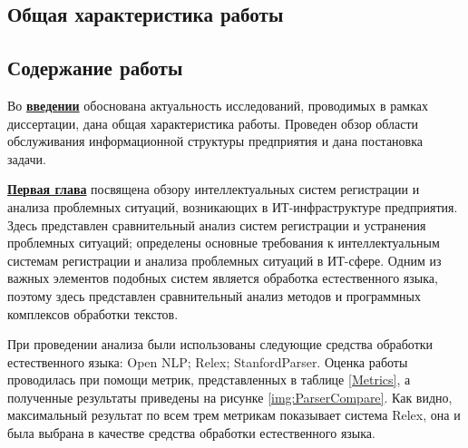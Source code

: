 \subsection*{Общая характеристика работы}

\newcommand{\actuality}{\underline{\textbf{Актуальность темы.}}}
\newcommand{\aim}{{\textbf{Целью}}}
\newcommand{\tasks}{{\textbf{задачи}}}
\newcommand{\scope}{{\textbf{Область исследования}}}
\newcommand{\subject}{{\textbf{Предметом исследования}}}
\newcommand{\methods}{{\textbf{Методы исследования}}}
\newcommand{\defpositions}{{\textbf{Основные положения, выносимые на~защиту:}}}
\newcommand{\novelty}{{\textbf{Научная новизна}}}
\newcommand{\influence}{{\textbf{Практическая значимость.}}}
\newcommand{\reliability}{{\textbf{Достоверность}}}
\newcommand{\probation}{{\textbf{Апробация работы.}}}
\newcommand{\contribution}{{\textbf{Личный вклад.}}}
\newcommand{\publications}{{\textbf{Публикации.}}}




\subsection*{Содержание работы}
Во \underline{\textbf{введении}} обоснована актуальность исследований, проводимых в рамках диссертации, дана общая характеристика работы. Проведен обзор области обслуживания информационной структуры предприятия и дана постановка задачи. \par
\underline{\textbf{Первая глава}} посвящена обзору интеллектуальных систем регистрации и анализа проблемных ситуаций, возникающих в ИТ-инфраструктуре предприятия. Здесь представлен сравнительный анализ систем регистрации и устранения проблемных ситуаций; определены основные требования к интеллектуальным системам регистрации и анализа проблемных ситуаций в ИТ-сфере. Одним из важных элементов подобных систем является обработка естественного языка, поэтому здесь представлен сравнительный анализ методов и программных комплексов обработки текстов. \par
При проведении анализа были использованы следующие средства обработки естественного языка: Open NLP; Relex; StanfordParser.
Оценка работы проводилась при помощи метрик, представленных в таблице \ref{Metrics}, а полученные результаты приведены на рисунке \ref{img:ParserCompare}. Как видно, максимальный результат по всем трем метрикам показывает система Relex, она и была выбрана в качестве средства обработки естественного языка.

